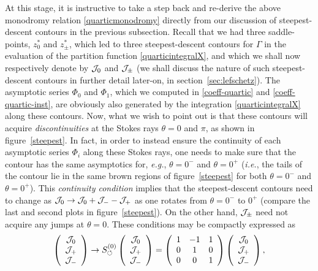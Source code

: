 \documentclass[11pt,a4paper]{article}
\newcommand{\CJ}{{\cal J}}
\begin{document}
At this stage, it is instructive to take a step back and re-derive the above monodromy relation \eqref{quarticmonodromy} directly from our discussion of steepest-descent contours in the previous subsection. Recall that we had three saddle-points, $z^*_0$ and $z^*_{\pm}$, which led to three steepest-descent contours for $\Gamma$ in the evaluation of the partition function \eqref{quarticintegralX}, and which we shall now respectively denote by $\CJ_0$ and $\CJ_\pm$ (we shall discuss the nature of such steepest-descent contours in further detail later-on, in section~\ref{sec:lefschetz}). The asymptotic series $\Phi_{0}$ and $\Phi_{1}$, which we computed in \eqref{coeff-quartic} and \eqref{coeff-quartic-inst}, are obviously also generated by the integration \eqref{quarticintegralX} along these contours. Now, what we wish to point out is that these contours will acquire \textit{discontinuities} at the Stokes rays $\theta=0$ and $\pi$, as shown in figure~\ref{steepest}. In fact, in order to instead ensure the continuity of each asymptotic series $\Phi_i$ along these Stokes rays, one needs to make sure that the contour has the same asymptotics for, \textit{e.g.}, $\theta=0^-$ and $\theta=0^+$ (\textit{i.e.}, the tails of the contour lie in the same brown regions of figure~\ref{steepest} for both $\theta=0^-$ and $\theta=0^+$). This \textit{continuity condition} implies that the steepest-descent contours need to change as $\CJ_0 \to \CJ_0 + \CJ_- - \CJ_+$ as one rotates from $\theta=0^-$ to $0^+$ (compare the last and second plots in figure~\ref{steepest}). On the other hand, $\CJ_\pm$ need not acquire any jumps at $\theta=0$. These conditions may be compactly expressed as
%
\begin{equation}
\left(
\begin{array}{ccc}
\CJ_0 \\
\CJ_+ \\
\CJ_-
\end{array}
\right) \to S_{\circlearrowleft}^{(0)} \left(
\begin{array}{ccc}
\CJ_0 \\
\CJ_+ \\
\CJ_-
\end{array}
\right) = \left(
\begin{array}{ccc}
1 & -1 & 1 \\
0 &  1 & 0 \\
0 &  0 & 1
\end{array}
\right) \left(
\begin{array}{ccc} 
\CJ_0 \\
\CJ_+ \\
\CJ_-
\end{array}
\right),
\end{equation}
\end{document}

